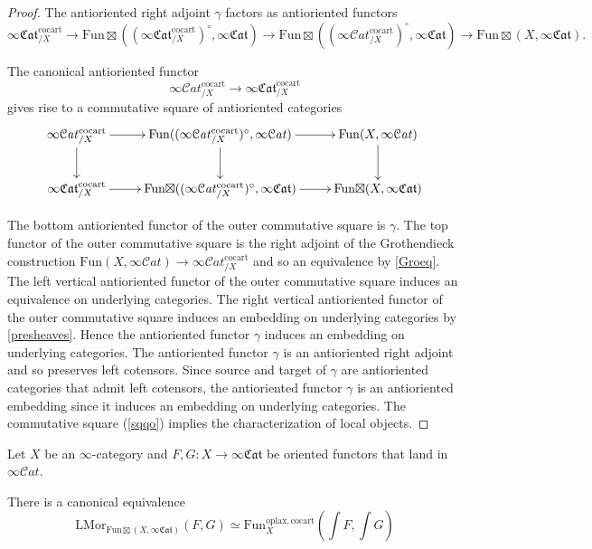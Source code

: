 \documentclass[10pt,oneside]{article}
\numberwithin{equation}{section} %
\numberwithin{figure}{section} %
\theoremstyle{plain}
\theoremstyle{definition}
\renewcommand{\L}{{\mathrm L}}
\newcommand{\Fun}{\mathrm{Fun}}
\newcommand{\cocart}{{\mathrm{cocart}}}
\newcommand{\oplax}{{\mathrm{oplax}}}
\newcommand{\Mor}{{\mathrm{Mor}}}
\newcommand{\scat}{\mathcal{C}\mathit{at}}
\newcommand{\fcat}{\mathfrak{Cat}}
\begin{document}
\begin{proof}
The antioriented right adjoint $\gamma$ factors as
antioriented functors
$$ \infty\mathfrak{Cat}_{/X}^\cocart \to {\Fun\boxtimes}((\infty\mathfrak{Cat}_{/X}^\cocart)^\circ,\infty\mathfrak{Cat}) 
\to {\Fun\boxtimes}((\infty\scat_{/X}^\cocart)^\circ,\infty\mathfrak{Cat}) \to {\Fun\boxtimes}(X,\infty\mathfrak{Cat}). $$

The canonical antioriented functor
$$ \infty\scat_{/X}^\cocart \to \infty\mathfrak{Cat}_{/X}^\cocart $$
gives rise to a commutative square of antioriented categories
\begin{equation}\label{sqqo}
\begin{xy}
\xymatrix{
\infty\scat_{/X}^\cocart \ar[d]^{} \ar[r]
& {\Fun}((\infty\scat_{/X}^\cocart)^\circ,\infty\scat) \ar[d]^{} \ar[r]
& {\Fun}(X,\infty\scat) \ar[d]
\\ 
\infty\mathfrak{Cat}_{/X}^\cocart \ar[r] & {\Fun\boxtimes}((\infty\scat_{/X}^\cocart)^\circ,\infty\mathfrak{Cat}) \ar[r] & {\Fun\boxtimes}(X,\infty\mathfrak{Cat})}
\end{xy}\end{equation}

The bottom antioriented functor of the outer commutative square is $\gamma.$
The top functor of the outer commutative square is the right adjoint of the Grothendieck construction
$ {\Fun}(X,\infty\scat) \to \infty\scat_{/X}^\cocart$ and so an equivalence by \cref{Groeq}.
The left vertical antioriented functor of the outer commutative square 
induces an equivalence on underlying categories.
The right vertical antioriented functor of the outer commutative square 
induces an embedding on underlying categories by \cref{presheaves}.
Hence the antioriented functor $\gamma$ induces an embedding on underlying categories.
The antioriented functor $\gamma$ is an antioriented right adjoint and so preserves left cotensors. Since source and target of $\gamma$ are antioriented categories that admit left cotensors, the antioriented functor $\gamma$ is an antioriented embedding since it induces an embedding on underlying categories.
The commutative square (\ref{sqqo}) implies the characterization of local objects.
\end{proof}

\begin{corollary}\label{Groorihom}

Let $X$ be an $\infty$-category and $F,G: X \to \infty\fcat$ be oriented functors that land in $\infty\scat.$

There is a canonical equivalence
$$ \L\Mor_{{\Fun\boxtimes}(X,\infty\mathfrak{Cat})}(F,G) \simeq \Fun^{\oplax, \cocart}_X(\int F, \int G)$$
    
\end{corollary}
\end{document}
